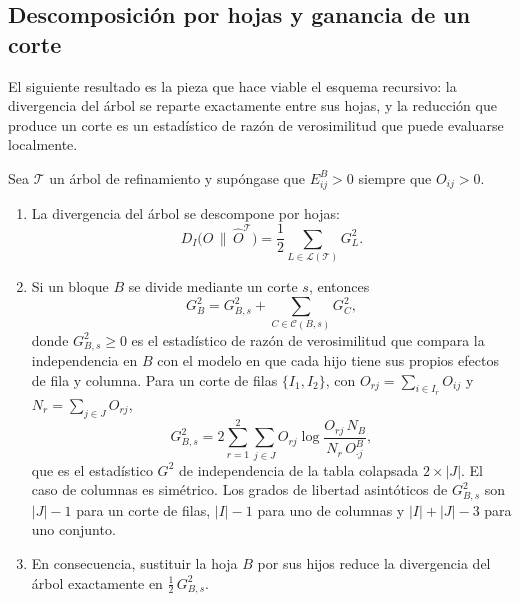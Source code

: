 \subsection{Descomposición por hojas y ganancia de un corte}\label{sec:prop-descomp}

El siguiente resultado es la pieza que hace viable el esquema recursivo: la
divergencia del árbol se reparte exactamente entre sus hojas, y la reducción que
produce un corte es un estadístico de razón de verosimilitud que puede evaluarse
localmente.

\begin{proposicion}\label{prop:ganancia}
Sea $\mathcal{T}$ un árbol de refinamiento y supóngase que $E^{B}_{ij}>0$
siempre que $O_{ij}>0$.
\begin{enumerate}
  \item[(a)] La divergencia del árbol se descompone por hojas:
  \begin{equation}\label{eq:prop-desc-hojas}
    D_I\bigl(O \,\|\, \hat O^{\mathcal{T}}\bigr)
    = \frac12 \sum_{L\in\mathcal{L}(\mathcal{T})} G^2_L .
  \end{equation}
  \item[(b)] Si un bloque $B$ se divide mediante un corte $s$, entonces
  \begin{equation}\label{eq:prop-cadena}
    G^2_B = G^2_{B,s} + \sum_{C\in\mathcal{C}(B,s)} G^2_C ,
  \end{equation}
  donde $G^2_{B,s}\ge 0$ es el estadístico de razón de verosimilitud que
  compara la independencia en $B$ con el modelo en que cada hijo tiene sus
  propios efectos de fila y columna. Para un corte de filas
  $\{I_1, I_2\}$, con $O_{rj} = \sum_{i\in I_r} O_{ij}$ y
  $N_r = \sum_{j\in J} O_{rj}$,
  \begin{equation}\label{eq:prop-G2-colapsada}
    G^2_{B,s} = 2\sum_{r=1}^{2}\sum_{j\in J} O_{rj}
      \log\frac{O_{rj}\,N_B}{N_r\,O^{B}_{\cdot j}},
  \end{equation}
  que es el estadístico $G^2$ de independencia de la tabla colapsada
  $2\times|J|$. El caso de columnas es simétrico. Los grados de libertad
  asintóticos de $G^2_{B,s}$ son $|J|-1$ para un corte de filas, $|I|-1$
  para uno de columnas y $|I|+|J|-3$ para uno conjunto.
  \item[(c)] En consecuencia, sustituir la hoja $B$ por sus hijos reduce la
  divergencia del árbol exactamente en $\tfrac12\, G^2_{B,s}$.
\end{enumerate}
\end{proposicion}

